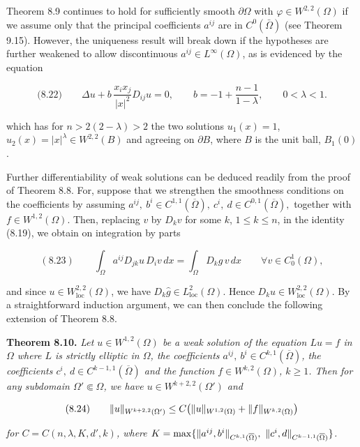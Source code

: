 \bigskip

\noindent Theorem 8.9 continues to hold for sufficiently smooth $\partial\Omega$ with $\varphi \in W^{2,2}(\Omega)$ if
we assume only that the principal coefficients $a^{ij}$ are in $C^0(\bar{\Omega})$ (see Theorem 9.15).
However, the uniqueness result will break down if the hypotheses are further
weakened to allow discontinuous $a^{ij} \in L^\infty(\Omega)$, as is evidenced by the equation

\[
\text{(8.22)} \qquad \Delta u + b\,\frac{x_i x_j}{\lvert x\rvert^2} D_{ij}u = 0,\qquad b=-1+\frac{n-1}{1-\lambda},\qquad 0<\lambda<1.
\]



which has for $n>2(2-\lambda)>2$ the two solutions $u_1(x)=1$, $u_2(x)=|x|^\lambda\in W^{2,2}(B)$ and agreeing on $\partial B$, where $B$ is the unit ball, $B_1(0)$.

Further differentiability of weak solutions can be deduced readily from the proof of Theorem 8.8. For, suppose that we strengthen the smoothness conditions on the coefficients by assuming $a^{ij},\ b^i\in C^{1,1}(\overline{\Omega}),\ c^i,\ d\in C^{0,1}(\overline{\Omega}),$ together with $f\in W^{1,2}(\Omega)$. Then, replacing $v$ by $D_k v$ for some $k$, $1\leq k\leq n$, in the identity (8.19), we obtain on integration by parts

\[
(8.23)\qquad \int_\Omega a^{ij}D_{jk}u\,D_i v\,dx=\int_\Omega D_k\hat{g}\,v\,dx \qquad \forall v\in C_0^1(\Omega),
\]

and since $u\in W^{2,2}_{\mathrm{loc}}(\Omega)$, we have $D_k\hat{g}\in L^2_{\mathrm{loc}}(\Omega)$. Hence $D_k u\in W^{2,2}_{\mathrm{loc}}(\Omega)$. By a straightforward induction argument, we can then conclude the following extension of Theorem 8.8.

\textbf{Theorem 8.10.} \textit{Let $u\in W^{1,2}(\Omega)$ be a weak solution of the equation $Lu=f$ in $\Omega$ where $L$ is strictly elliptic in $\Omega$, the coefficients $a^{ij},\ b^i\in C^{k,1}(\overline{\Omega})$, the coefficients $c^i,\ d\in C^{k-1,1}(\overline{\Omega})$ and the function $f\in W^{k,2}(\Omega)$, $k\geq 1$. Then for any subdomain $\Omega'\Subset\Omega$, we have $u\in W^{k+2,2}(\Omega')$ and}

\[
(8.24)\qquad \lVert u\rVert_{W^{k+2,2}(\Omega')}\leq C\bigl(\lVert u\rVert_{W^{1,2}(\Omega)}+\lVert f\rVert_{W^{k,2}(\Omega)}\bigr)
\]

\textit{for $C=C(n,\lambda,K,d',k)$, where $K=\max\{\norm{a^{ij},b^i}_{C^{k,1}(\overline{\Omega})},\ \norm{c^i,d}_{C^{k-1,1}(\overline{\Omega})}\}$.}

